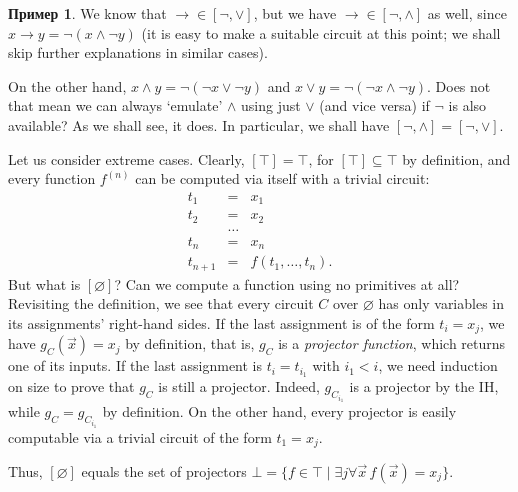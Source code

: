 \documentclass[12pt,notitlepage]{article}
\theoremstyle{plain}
\theoremstyle{definition}
\newtheorem{exm}[thm]{Пример}
\theoremstyle{plain}
\newcommand{\sbs}{\subseteq}
\newcommand{\void}{\varnothing}
\newcommand{\1}{\mathbf{1}}
\newcommand{\0}{\mathbf{0}}
\begin{document}
\begin{exm}
	We know that ${\to} \in [{\neg}, {\vee}]$, but we have ${\to} \in [{\neg}, {\wedge}]$ as well, since $x \to y = \neg (x \wedge \neg y)$ (it is easy to make a suitable circuit at this point; we shall skip further explanations in similar cases).
	
	On the other hand, $x \wedge y = \neg (\neg x \vee \neg y)$ and $x \vee y = \neg (\neg x \wedge \neg y)$. Does not that mean we can always `emulate' $\wedge$ using just $\vee$ (and vice versa) if $\neg$ is also available? As we shall see, it does. In particular, we shall have $[{\neg}, {\wedge}] = [{\neg}, {\vee}]$.
	
	Let us consider extreme cases. Clearly, $[\top] = \top$, for $[\top] \sbs \top$ by definition, and every function $f^{(n)}$ can be computed via itself with a trivial circuit:
	\begin{equation}\label{bool:triv_circ}
		\begin{array}{rcl}
			t_1 &=& x_1\\
			t_2 &=& x_2\\
			&\ldots&\\
			t_n &=& x_n\\
			t_{n+1} &=& f(t_1, \ldots, t_n).
		\end{array}
	\end{equation}
	But what is $[\void]$? Can we compute a function using no primitives at all? Revisiting the definition, we see that every circuit $C$ over $\void$ has only variables in its assignments' right-hand sides. If the last assignment is of the form $t_i = x_j$, we have $g_C(\vec x) = x_j$ by definition, that is, $g_C$ is a \emph{projector function}, which returns one of its inputs. If the last assignment is $t_i = t_{i_1}$ with $i_1 < i$, we need induction on size to prove that $g_C$ is still a projector. Indeed, $g_{C_{i_1}}$ is a projector by the IH, while $g_C = g_{C_{i_1}}$ by definition. On the other hand, every projector is easily computable via a trivial circuit of the form $t_1 = x_j$.
	
	Thus, $[\void]$ equals the set of projectors $\bot = \{ f\in \top \mid \exists j \forall \vec x\, f(\vec x)  = x_j \}$.
\end{exm}
\end{document}
